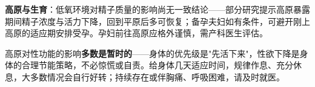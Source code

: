 \vspace{0.5em}
\noindent\textbf{高原与生育}：低氧环境对精子质量的影响尚无一致结论——部分研究提示高原暴露期间精子浓度与活力下降，回到平原后多可恢复；备孕夫妇如有条件，可避开刚上高原的适应期安排受孕。孕妇前往高原应格外谨慎，需产科医生评估。

\begin{tcolorbox}[colback=pink!5!white,colframe=red!50!black,title=贴心小叮咛]
高原对性功能的影响\textbf{多数是暂时的}——身体的优先级是"先活下来"，性欲下降是身体的合理节能策略，不必惊慌或自责。给身体几天适应时间，规律作息、充分休息，大多数情况会自行好转；持续存在或伴胸痛、呼吸困难，请及时就医。
\end{tcolorbox}
